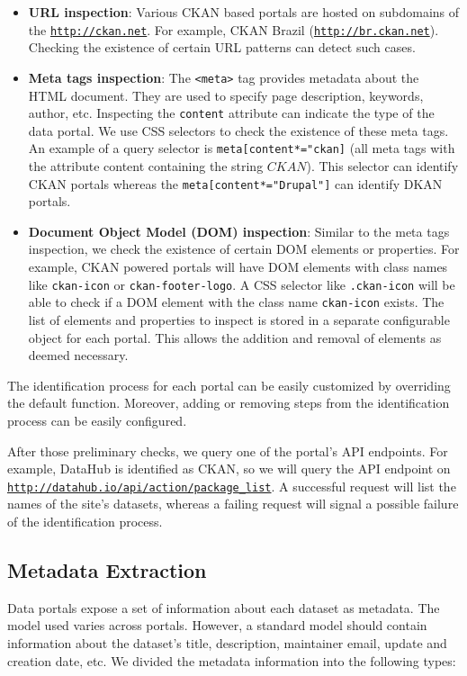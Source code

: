 \documentclass[runningheads,a4paper]{llncs}
\begin{document}
\begin{itemize}
  \item \textbf{URL inspection}: Various CKAN based portals are hosted on subdomains of the \texttt{\url{http://ckan.net}}. For example, CKAN Brazil (\texttt{\url{http://br.ckan.net}}). Checking the existence of certain URL patterns can detect such cases.
  \item \textbf{Meta tags inspection}: The \texttt{<meta>} tag provides metadata about the HTML document. They are used to specify page description, keywords, author, etc. Inspecting the \texttt{content} attribute can indicate the type of the data portal. We use CSS selectors to check the existence of these meta tags. An example of a query selector is \texttt{meta[content*="ckan]} (all meta tags with the attribute content containing the string $CKAN$). This selector can identify CKAN portals whereas the \texttt{meta[content*="Drupal"]} can identify DKAN portals.
  \item \textbf{Document Object Model (DOM) inspection}: Similar to the meta tags inspection, we check the existence of certain DOM elements or properties. For example, CKAN powered portals will have DOM elements with class names like \texttt{ckan-icon} or \texttt{ckan-footer-logo}. A CSS selector like \texttt{.ckan-icon} will be able to check if a DOM element with the class name \texttt{ckan-icon} exists.
  The list of elements and properties to inspect is stored in a separate configurable object for each portal. This allows the addition and removal of elements as deemed necessary.
\end{itemize}

The identification process for each portal can be easily customized by overriding the default function. Moreover, adding or removing steps from the identification process can be easily configured.

After those preliminary checks, we query one of the portal's API endpoints. For example, DataHub is identified as CKAN, so we will query the API endpoint on \texttt{\url{http://datahub.io/api/action/package\_list}}. A successful request will list the names of the site's datasets, whereas a failing request will signal a possible failure of the identification process.

\subsection{Metadata Extraction}

Data portals expose a set of information about each dataset as metadata. The model used varies across portals. However, a standard model should contain information about the dataset's title, description, maintainer email, update and creation date, etc. We divided the metadata information into the following types:
\end{document}
